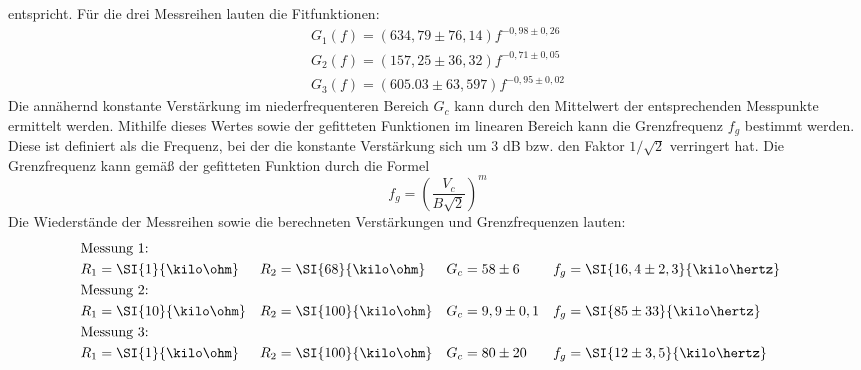 entspricht. Für die drei Messreihen lauten die Fitfunktionen:
\begin{gather}
G_1(f)=(634,79\pm76,14)f^{-0,98\pm0,26} \\
G_2(f)=(157,25\pm36,32)f^{-0,71\pm0,05} \\
G_3(f)=(605.03\pm63,597)f^{-0,95\pm0,02}
\end{gather}
Die annähernd konstante Verstärkung im niederfrequenteren Bereich $G_c$ kann durch den Mittelwert der entsprechenden Messpunkte ermittelt werden. Mithilfe dieses Wertes sowie der gefitteten Funktionen im linearen Bereich kann die Grenzfrequenz $f_g$ bestimmt werden. Diese ist definiert als die Frequenz, bei der die konstante Verstärkung sich um 3 dB bzw. den Faktor $1/\sqrt{2}$ verringert hat. Die Grenzfrequenz kann gemäß der gefitteten Funktion durch die Formel
\begin{equation}
f_g=\left(\frac{V_c}{B\sqrt{2}}\right)^m
\end{equation}
Die Wiederstände der Messreihen sowie die berechneten Verstärkungen und Grenzfrequenzen lauten:
\begin{align*}
    &\text{Messung 1:}\\
    & R_1 = \SI{1}{\kilo\ohm}     &&  R_2 = \SI{68}{\kilo\ohm}     &&  G_c = 58\pm6  && f_g=\SI{16,4\pm2,3}{\kilo\hertz}  \\
    &\text{Messung 2:}\\
   & R_1 = \SI{10}{\kilo\ohm}     &&  R_2 = \SI{100}{\kilo\ohm}     &&  G_c = 9,9\pm0,1  && f_g=\SI{85\pm33}{\kilo\hertz} \\
    &\text{Messung 3:}\\
   & R_1 = \SI{1}{\kilo\ohm}     &&  R_2 = \SI{100}{\kilo\ohm}     &&  G_c = 80\pm20  && f_g=\SI{12\pm3,5}{\kilo\hertz} \\
\end{align*}
